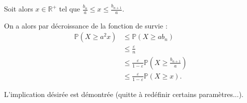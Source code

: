 Soit alors $x\in\mathbb{R}^{+}$ tel que $\displaystyle \frac{b_{n}}{a}\leq x\leq \frac{b_{n+1}}{a}.$

On a alors par décroissance de la fonction de survie :
\begin{align*}
\mathbb{P}(X\geq a^{2}x) & \leq \mathbb{P}(X\geq ab_{n})\\
& \leq \frac{\varepsilon}{n}\\
& \leq \frac{\varepsilon}{1-\varepsilon}\mathbb{P}(X\geq \frac{b_{n+1}}{a})\\
& \leq \frac{\varepsilon}{1-\varepsilon}\mathbb{P}(X\geq x).
\end{align*}

L'implication désirée est démontrée (quitte à redéfinir certains paramètres...).